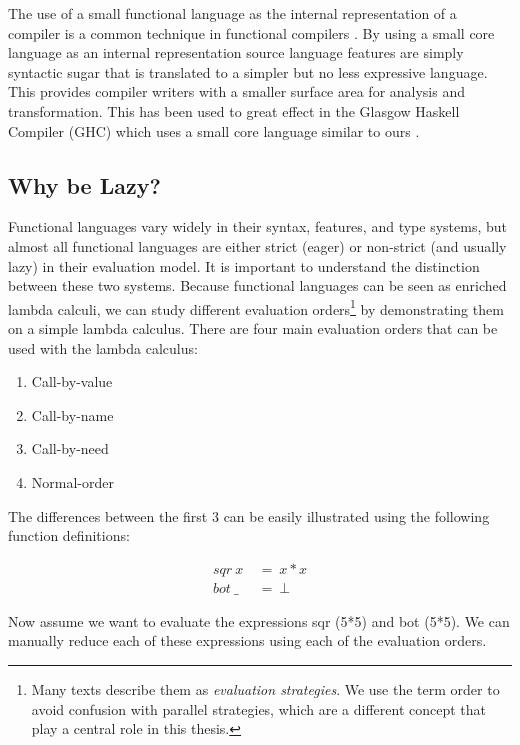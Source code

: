 The use of a small functional language as the internal representation of a
compiler is a common technique in functional compilers \citep{dutchBook,
PeytonJones:IFL, Augustsson:LazyMLCompiler, UHC}. By using a small core
language as an internal representation source language features are simply
syntactic sugar that is translated to a simpler but no less expressive
language. This provides compiler writers with a smaller surface area for
analysis and transformation. This has been used to great effect in the Glasgow
Haskell Compiler (GHC) which uses a small core language similar to ours
\citep{peyton2002secrets, jones1998transformation}. 

\subsection{Why be Lazy?}

Functional languages vary widely in their syntax, features, and type systems,
but almost all functional languages are either strict (eager) or non-strict
(and usually lazy) in their evaluation model. It is important to understand the
distinction between these two systems. Because functional languages can be
seen as enriched lambda calculi, we can study different evaluation
orders\footnote{Many texts describe them as \emph{evaluation strategies}.  We
use the term order to avoid confusion with parallel strategies, which are a
different concept that play a central role in this thesis.} by demonstrating
them on a simple lambda calculus. There are four main evaluation orders that
can be used with the lambda calculus:

    \begin{enumerate}
        \item Call-by-value
        \item Call-by-name
        \item Call-by-need
        \item Normal-order
    \end{enumerate}

The differences between the first 3 can be easily illustrated using the
following function definitions:

\begin{align*}
    sqr \ x \  &= \  x * x \\
    bot \ \_ \ &= \  \bot
\end{align*}

Now assume we want to evaluate the expressions \<sqr (5*5)\> and \<bot (5*5)\>.
We can manually reduce each of these expressions using each of the evaluation
orders.

